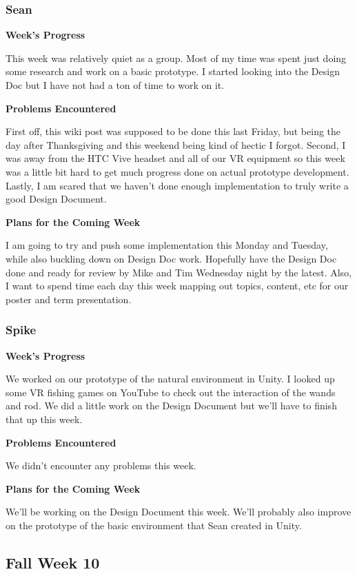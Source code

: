 \documentclass[10pt,journal,compsoc,onecolumn, draftclsnofoot]{IEEEtran}
\begin{document}
\subsubsection{Sean}
\noindent \textbf{Week's Progress}

This week was relatively quiet as a group.  Most of my time was spent just doing some research and work on a basic prototype. I started looking into the Design Doc but I have not had a ton of time to work on it.

\noindent \textbf{Problems Encountered}

First off, this wiki post was supposed to be done this last Friday, but being the day after Thanksgiving and this weekend being kind of hectic I forgot.  Second, I was away from the HTC Vive headset and all of our VR equipment so this week was a little bit hard to get much progress done on actual prototype development.  Lastly, I am scared that we haven't done enough implementation to truly write a good Design Document.

\noindent \textbf{Plans for the Coming Week}

I am going to try and push some implementation this Monday and Tuesday, while also buckling down on Design Doc work.  Hopefully have the Design Doc done and ready for review by Mike and Tim Wednesday night by the latest. Also, I want to spend time each day this week mapping out topics, content, etc for our poster and term presentation.

\subsubsection{Spike}
\noindent \textbf{Week's Progress}

We worked on our prototype of the natural environment in Unity. I looked up some VR fishing games on YouTube to check out the interaction of the wands and rod. We did a little work on the Design Document but we'll have to finish that up this week.

\noindent \textbf{Problems Encountered}

We didn't encounter any problems this week.

\noindent \textbf{Plans for the Coming Week}

We'll be working on the Design Document this week. We'll probably also improve on the prototype of the basic environment that Sean created in Unity.

\subsection{Fall Week 10}
\end{document}
